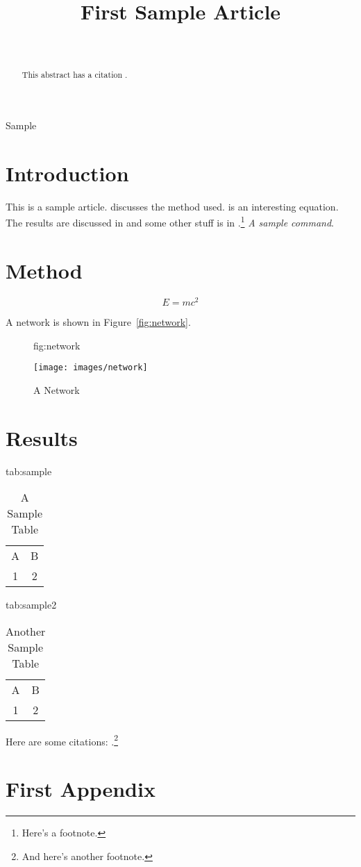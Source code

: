 \documentclass[wcp]{jmlr}
\title[Article 1]{First Sample Article}
\author{\Name{Jane Doe}\Email{jd@sample.com}\and
\Name{John {Smith Jones}}\Email{jsj@sample.com}\\
\addr{University of No Where}}
\newcommand{\samplecommand}{\emph{A sample command}}
\begin{document}
\maketitle

\begin{abstract}
This abstract has a citation \citep{guyon-elisseeff-03}.
\lipsum[1]
\end{abstract}
\begin{keywords}
Sample
\end{keywords}

\section{Introduction}

This is a sample article.  discusses
the method used.  is an interesting 
equation. The results are discussed in 
and some other stuff is in .\footnote{Here's
a footnote.}
\samplecommand.

\lipsum

\section{Method}\label{sec:method}

\lipsum

\begin{equation}\label{eq:emc2}
E = mc^2
\end{equation}

A network is shown in Figure~\ref{fig:network}.

\begin{figure}[htbp]
 \floatconts
   {fig:network}%
   {\caption{A Network}}%
   {\texttt{[image: images/network]}}%
\end{figure}

\section{Results}\label{sec:results}

\begin{table}[htbp]
\floatconts
  {tab:sample}
  {\caption{A Sample Table}}
  {%
    \begin{tabular}{cc}
    A & B\\
    1 & 2
    \end{tabular}
  }%
\end{table}

\begin{table}[htbp]
\floatconts
  {tab:sample2}
  {\caption{Another Sample Table}}
  {%
    \begin{tabular}{cc}
    A & B\\
    1 & 2
    \end{tabular}
  }%
\end{table}

\lipsum

Here are some citations:
\citet{guyon-elisseeff-03,guyon2007causalreport}.\footnote{And
here's another footnote.}



\appendix
\section{First Appendix}\label{apd:first}

\lipsum
\end{document}
